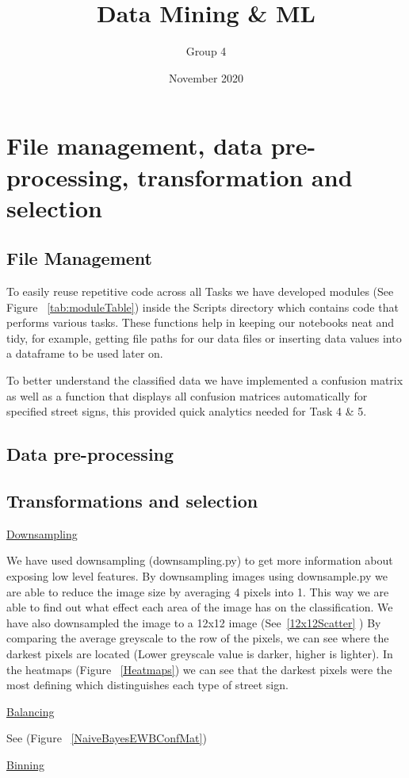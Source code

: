 \documentclass[11pt]{article}
\title{Data Mining \& ML}
\author{ Group 4 }
\date{November 2020}
\begin{document}
\maketitle

\pagebreak

\tableofcontents
\thispagestyle{empty}
\pagebreak
\setcounter{page}{1}

\pagebreak

    

\section{File management, data pre-processing, transformation and selection} 
\subsection{File Management}

To easily reuse repetitive code across all Tasks we have developed modules (See Figure ~\ref{tab:moduleTable}) inside 
the Scripts directory which contains code that performs various tasks. These functions help
in keeping our notebooks neat and tidy, for example, getting file paths for our data files or 
inserting data values into a dataframe to be used later on.
\par
To better understand the classified data we have implemented a confusion matrix as well as 
a function that displays all confusion matrices automatically for specified street signs, this 
provided quick analytics needed for Task 4 \& 5.

\subsection{Data pre-processing}


\subsection{Transformations and selection}\label{sec:transSel}

\underline{Downsampling}
\par
We have used downsampling (downsampling.py) to get more information about exposing low level features.
By downsampling images using downsample.py we are able to reduce the image size by averaging 4 pixels into 1. This way we are able to find out what effect each area of the image has on the classification.
We have also downsampled the image to a 12x12 image (See~\ref{12x12Scatter} )
By comparing the average greyscale to the row of the pixels, we can see where the
darkest pixels are located (Lower greyscale value is darker, higher is lighter).
In the heatmaps (Figure ~\ref{Heatmaps}) we can see that the darkest pixels were the most defining which distinguishes 
each type of street sign.
\par
\underline{Balancing}
\par
See (Figure ~\ref{NaiveBayesEWBConfMat}) 
\par
\underline{Binning}
\par
\end{document}
